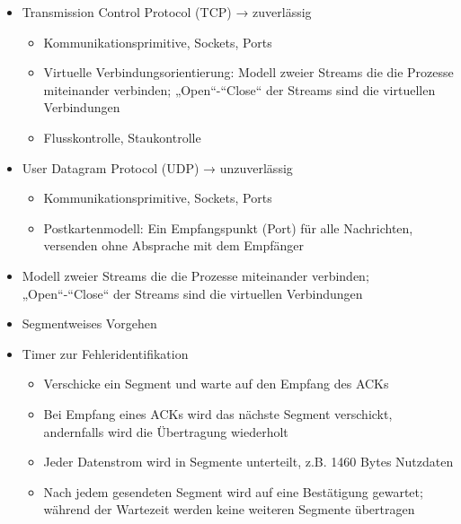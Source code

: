 
\begin{itemize}
    \item Transmission Control Protocol (TCP) → zuverlässig
    \begin{itemize}
        \item Kommunikationsprimitive, Sockets, Ports
        \item Virtuelle Verbindungsorientierung: Modell zweier Streams die die Prozesse miteinander verbinden;
        „Open“-“Close“ der Streams sind die virtuellen Verbindungen
        \item Flusskontrolle, Staukontrolle
    \end{itemize}
    \item User Datagram Protocol (UDP) → unzuverlässig
    \begin{itemize}
        \item Kommunikationsprimitive, Sockets, Ports
        \item Postkartenmodell: Ein Empfangspunkt (Port) für alle Nachrichten, versenden ohne Absprache mit dem Empfänger
    \end{itemize}
\end{itemize}

\begin{itemize}
    \item Modell zweier Streams die die Prozesse miteinander verbinden;
    „Open“-“Close“ der Streams sind die virtuellen Verbindungen
\end{itemize}

\begin{itemize}
    \item Segmentweises Vorgehen
    \item Timer zur Fehleridentifikation
    \begin{itemize}
        \item Verschicke ein Segment und warte auf den Empfang des ACKs
        \item Bei Empfang eines ACKs wird das nächste Segment verschickt, andernfalls wird die Übertragung wiederholt
        \item Jeder Datenstrom wird in Segmente unterteilt, z.B. 1460 Bytes Nutzdaten
        \item Nach jedem gesendeten Segment wird auf eine Bestätigung gewartet;
        während der Wartezeit werden keine weiteren Segmente übertragen
    \end{itemize}
\end{itemize}

